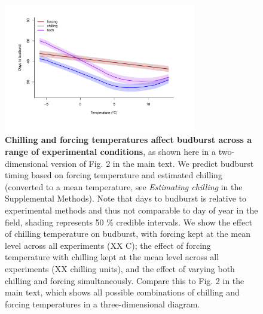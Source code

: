\documentclass{article}
\begin{document}
\begin{figure}[h!]
\centering
\noindent \includegraphics[width=0.75\textwidth]{..//..//analyses/bb_analysis/figures/mupredictschill_utah_pep.pdf}
\caption{\textbf{Chilling and forcing temperatures affect budburst across a range of experimental conditions}, as shown here in a two-dimensional version of Fig. 2 in the main text. We predict budburst timing based on forcing temperature and estimated chilling (converted to a mean temperature, see \emph{Estimating chilling} in the Supplemental Methods). Note that days to budburst is relative to experimental methods and thus not comparable to day of year in the field, shading represents 50 \% credible intervals. We show the effect of chilling temperature on budburst, with forcing kept at the mean level across all experiments (XX \degree C);  the effect of forcing temperature with chilling kept at the mean level across all experiments (XX chilling units), and  the effect of varying both chilling and forcing simultaneously.  Compare  this to Fig. 2 in the main text, which shows all possible combinations of chilling and forcing temperatures in a three-dimensional diagram.}
\label{fig:2dfieldchillutah}
\end{figure}
\end{document}
